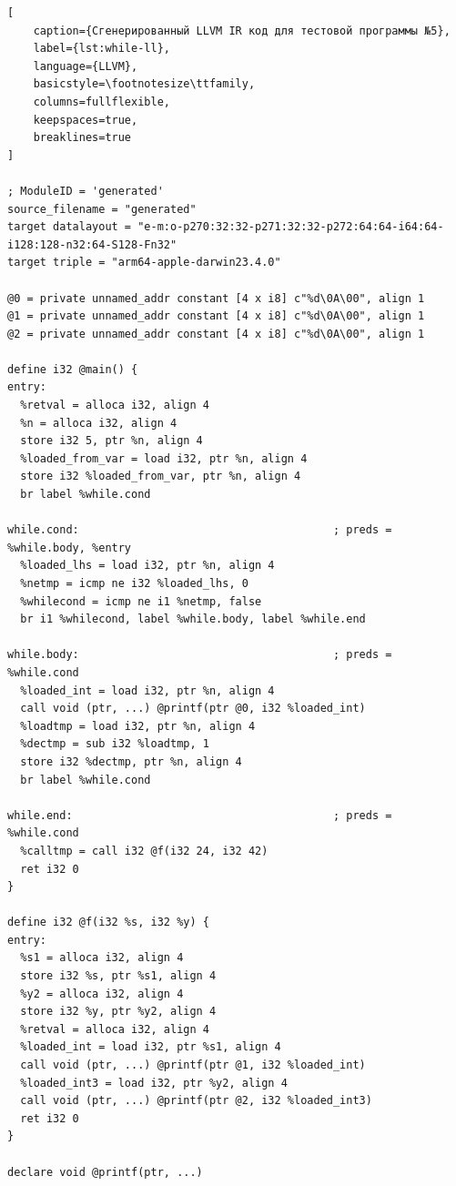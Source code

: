 \begin{lstlisting}[
    caption={Сгенерированный LLVM IR код для тестовой программы №5},
    label={lst:while-ll},
    language={LLVM},
    basicstyle=\footnotesize\ttfamily,
    columns=fullflexible,
    keepspaces=true,
    breaklines=true
]

; ModuleID = 'generated'
source_filename = "generated"
target datalayout = "e-m:o-p270:32:32-p271:32:32-p272:64:64-i64:64-i128:128-n32:64-S128-Fn32"
target triple = "arm64-apple-darwin23.4.0"

@0 = private unnamed_addr constant [4 x i8] c"%d\0A\00", align 1
@1 = private unnamed_addr constant [4 x i8] c"%d\0A\00", align 1
@2 = private unnamed_addr constant [4 x i8] c"%d\0A\00", align 1

define i32 @main() {
entry:
  %retval = alloca i32, align 4
  %n = alloca i32, align 4
  store i32 5, ptr %n, align 4
  %loaded_from_var = load i32, ptr %n, align 4
  store i32 %loaded_from_var, ptr %n, align 4
  br label %while.cond

while.cond:                                       ; preds = %while.body, %entry
  %loaded_lhs = load i32, ptr %n, align 4
  %netmp = icmp ne i32 %loaded_lhs, 0
  %whilecond = icmp ne i1 %netmp, false
  br i1 %whilecond, label %while.body, label %while.end

while.body:                                       ; preds = %while.cond
  %loaded_int = load i32, ptr %n, align 4
  call void (ptr, ...) @printf(ptr @0, i32 %loaded_int)
  %loadtmp = load i32, ptr %n, align 4
  %dectmp = sub i32 %loadtmp, 1
  store i32 %dectmp, ptr %n, align 4
  br label %while.cond

while.end:                                        ; preds = %while.cond
  %calltmp = call i32 @f(i32 24, i32 42)
  ret i32 0
}

define i32 @f(i32 %s, i32 %y) {
entry:
  %s1 = alloca i32, align 4
  store i32 %s, ptr %s1, align 4
  %y2 = alloca i32, align 4
  store i32 %y, ptr %y2, align 4
  %retval = alloca i32, align 4
  %loaded_int = load i32, ptr %s1, align 4
  call void (ptr, ...) @printf(ptr @1, i32 %loaded_int)
  %loaded_int3 = load i32, ptr %y2, align 4
  call void (ptr, ...) @printf(ptr @2, i32 %loaded_int3)
  ret i32 0
}

declare void @printf(ptr, ...)


\end{lstlisting}


